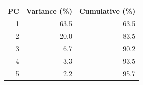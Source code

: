 
\begin{tabular}{rrr}
\toprule
PC & Variance (\%) & Cumulative (\%)\\
\midrule
1 & 63.5 & 63.5\\
2 & 20.0 & 83.5\\
3 & 6.7 & 90.2\\
4 & 3.3 & 93.5\\
5 & 2.2 & 95.7\\
\bottomrule
\end{tabular}
